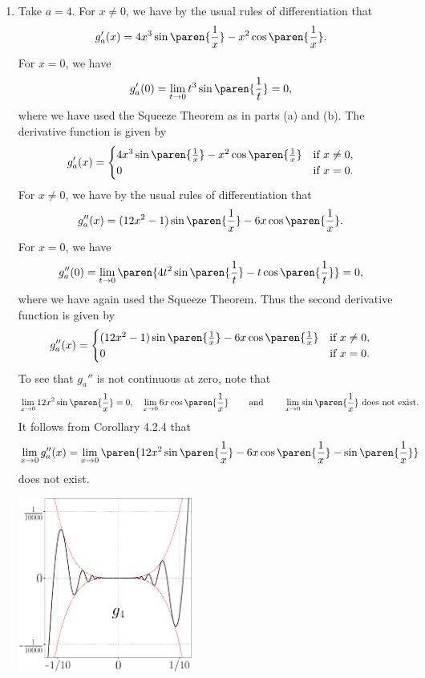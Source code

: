\documentclass{lew98_solutions}
\begin{document}
\begin{solution}
\begin{enumerate}
        \item Take \( a = 4 \). For \( x \neq 0 \), we have by the usual rules of differentiation that
        \[
            g_a'(x) = 4 x^3 \sin \paren{\frac{1}{x}} - x^2 \cos \paren{\frac{1}{x}}. 
        \]
        For \( x = 0 \), we have
        \[
            g_a'(0) = \lim_{t \to 0} t^3 \sin \paren{\frac{1}{t}} = 0,
        \]
        where we have used the Squeeze Theorem as in parts (a) and (b). The derivative function is given by
        \[
            g_a'(x) = \begin{cases}
                4 x^3 \sin \paren{\tfrac{1}{x}} - x^2 \cos \paren{\tfrac{1}{x}} & \text{if } x \neq 0, \\
                0 & \text{if } x = 0.
            \end{cases}
        \]
        For \( x \neq 0 \), we have by the usual rules of differentiation that
        \[
            g_a''(x) = (12 x^2 - 1) \sin \paren{\frac{1}{x}} - 6 x \cos \paren{\frac{1}{x}}. 
        \]
        For \( x = 0 \), we have
        \[
            g_a''(0) = \lim_{t \to 0} \paren{4 t^2 \sin \paren{\frac{1}{t}} - t \cos \paren{\frac{1}{t}}} = 0,
        \]
        where we have again used the Squeeze Theorem. Thus the second derivative function is given by
        \[
            g_a''(x) = \begin{cases}
                (12 x^2 - 1) \sin \paren{\tfrac{1}{x}} - 6 x \cos \paren{\tfrac{1}{x}} & \text{if } x \neq 0, \\
                0 & \text{if } x = 0.
            \end{cases}
        \]
        To see that \( g_a'' \) is not continuous at zero, note that
        \[
            \lim_{x \to 0} 12 x^2 \sin \paren{\frac{1}{x}} = 0, \quad \lim_{x \to 0} 6 x \cos \paren{\frac{1}{x}} \hspaceand \lim_{x \to 0} \sin \paren{\frac{1}{x}} \text{ does not exist}.
        \]
        It follows from Corollary 4.2.4 that
        \[
            \lim_{x \to 0} g_a''(x) = \lim_{x \to 0} \paren{ 12 x^2 \sin \paren{\frac{1}{x}} - 6 x \cos \paren{\frac{1}{x}} - \sin \paren{\frac{1}{x}} }
        \]
        does not exist.
        \begin{center}
            \includegraphics[width=0.45\textwidth]{UA_Figures/UA_ex5_2_7_fig_5.pdf}

\end{center}
\end{enumerate}
\end{solution}
\end{document}
